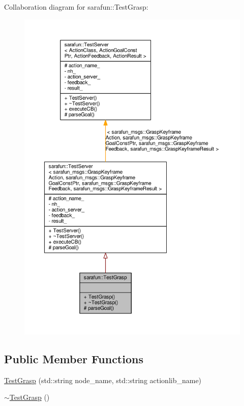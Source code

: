Collaboration diagram for sarafun\-:\-:Test\-Grasp\-:
\nopagebreak
\begin{figure}[H]
\begin{center}
\leavevmode
\includegraphics[width=350pt]{df/db8/classsarafun_1_1TestGrasp__coll__graph}
\end{center}
\end{figure}
\subsection*{Public Member Functions}
\begin{DoxyCompactItemize}
\item 
\hyperlink{classsarafun_1_1TestGrasp_a271a9845d2436b578a67b5be0b1ff3f3_a271a9845d2436b578a67b5be0b1ff3f3}{Test\-Grasp} (std\-::string node\-\_\-name, std\-::string actionlib\-\_\-name)
\item 
\hyperlink{classsarafun_1_1TestGrasp_ac49b5dffffedba55736264d9c321df22_ac49b5dffffedba55736264d9c321df22}{$\sim$\-Test\-Grasp} ()
\end{DoxyCompactItemize}
